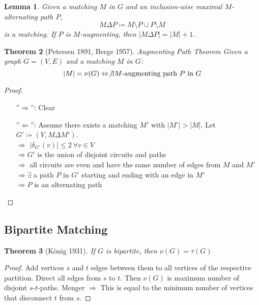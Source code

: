 \documentclass[11pt, a4paper]{article}
\newcommand{\abs}[1]{\left\lvert#1\right\rvert}
\newtheorem{theorem}{Theorem}[section]
\newtheorem{lemma}[theorem]{Lemma}
\theoremstyle{remark}
\theoremstyle{definition}
\begin{document}
\begin{lemma}
	Given a matching $M$ in $G$ and an inclusion-wise maximal
	$M$-alternating path $P$,
	\[M\Delta P\coloneqq M\setminus P\cup P\setminus M\]
	is a matching. If $P$ is $M$-augmenting, then $\abs{M\Delta
			P}=\abs{M}+1$.
\end{lemma}

\begin{theorem}[Petersen 1891, Berge 1957]{Augmenting Path Theorem}
	Given a graph $G=(V,E)$ and a matching $M$ in $G$:
	\[\abs{M}=\nu(G) \Leftrightarrow \not\exists \text{$M$-augmenting
			path $P$ in $G$}\]
\end{theorem}
\begin{proof}\
	\begin{enumerate}
		\item[''$\Rightarrow$'':] Clear
		\item[''$\Leftarrow$'':] Assume there exists a matching $M'$
		with $\abs{M'}>\abs{M}$. Let $G'\coloneqq (V, M\Delta M')$. \\
		$\Rightarrow$ $\abs{\delta_{G'}(v)}\leq 2\ \forall v\in V$ \\
		$\Rightarrow G'$ is the union of disjoint circuits and paths \\
		$\Rightarrow$ all circuits are even and have the same number of edges
		from $M$ and $M'$ \\
		$\Rightarrow \exists$ a path $P$ in $G'$ starting and ending with an
		edge in $M'$ \\
		$\Rightarrow P$ is an alternating path
	\end{enumerate}
\end{proof}

\subsection{Bipartite Matching}

\begin{theorem}[König 1931]\label{thm:koenig-bipartite}
	If $G$ is bipartite, then $\nu(G)=\tau(G)$
\end{theorem}
\begin{proof}
	Add vertices $s$ and $t$ edges between them to all vertices of the
	respective partition. Direct all edges from $s$ to $t$. Then
	$\nu(G)$ is maximum number of disjoint $s$-$t$-paths. Menger
	$\Rightarrow$ This is equal to the minimum number of vertices that
	disconnect $t$ from $s$.
\end{proof}
\end{document}
